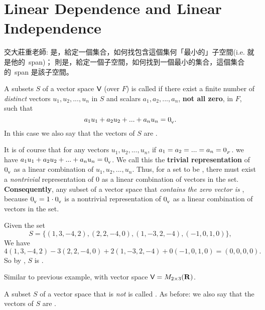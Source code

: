 \section{Linear Dependence and Linear Independence} \label{sec 1.5}

\begin{note}
交大莊重老師:  是，給定一個集合，如何找包含這個集何「最小的」子空間(i.e. 就是他的\ span)；
 則是，給定一個子空間，如何找到一個最小的集合，這個集合的\ span 是該子空間。
\end{note}

\begin{definition} \label{def 1.6}
A subsets \(S\) of a vector space \(\textsf{V}\) (over \(F\)) is called \textbf{\LDP{}} if there exist a finite number of \emph{distinct} vectors \(u_1, u_2, ..., u_n\) in \(S\) and scalars \(a_1, a_2, ..., a_n\), \textbf{not all zero}, in \(F\), such that
\[
    a_1 u_1 + a_2 u_2 + ... + a_n u_n = 0_{_{\textsf{V}}}.
\]
In this case we also say that the vectors of \(S\) are \LDP{}.
\end{definition}

\begin{additional definition} \label{adef 1.10}
It is of course that for any vectors \(u_1, u_2, ..., u_n\), if \(a_1 = a_2 = ... = a_n = 0_{_F}\). we have \(a_1 u_1 + a_2 u_2 + ... + a_n u_n = 0_{_{\textsf{V}}}\).
We call this the \textbf{trivial representation} of \(0_{_{\textsf{V}}}\) as a linear combination of \(u_1, u_2, ..., u_n\).
Thus, for a set to be \LDP{}, there must exist a \emph{nontrivial} representation of \(0\) as a linear combination of vectors in the set.
\textbf{Consequently}, any subset of a vector space that \emph{contains the zero vector is \LDP{}}, because \(0_{_{\textsf{V}}} = 1 \cdot 0_{_{\textsf{V}}}\) is a nontrivial representation of \(0_{_{\textsf{V}}}\) as a linear combination of vectors in the set.
\end{additional definition}

\begin{example}
Given the set
\[
    S = \{(1, 3, -4, 2), (2, 2, -4, 0), (1, -3, 2, -4), ( -1, 0, 1, 0)\},
\]
We have
\[
    4(1, 3, -4, 2) - 3(2, 2, -4, 0) + 2(1, -3, 2, -4) + 0( -1 , 0, 1, 0) = (0, 0, 0, 0).
\]
So by , \(S\) is \LDP{}.
\end{example}

\begin{example}
Similar to previous example, with vector space \(\textsf{V} = M_{2 \times 3}(\mathbf{R})\).
\end{example}

\begin{definition} \label{def 1.7}
A subset \(S\) of a vector space that is \emph{not} \LDP{} is called \textbf{\LID{}}.
As before: we also say that the vectors of \(S\) are \LID{}.
\end{definition}

